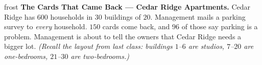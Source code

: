 \documentclass[10pt]{article}
\begin{document}

\vspace{0.15in}

\begin{headlinebox}{frost}
\small
\textbf{The Cards That Came Back --- Cedar Ridge Apartments.} Cedar Ridge has
$600$ households in $30$ buildings of $20$. Management mails a parking survey to
\emph{every} household. $150$ cards come back, and $96$ of those say parking is a
problem. Management is about to tell the owners that Cedar Ridge needs a bigger
lot. \emph{(Recall the layout from last class: buildings $1$--$6$ are studios,
$7$--$20$ are one-bedrooms, $21$--$30$ are two-bedrooms.)}
\end{headlinebox}

\vspace{0.06in}
\end{document}
